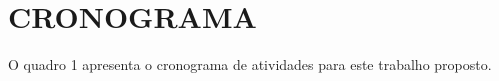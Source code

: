 
\chapter{CRONOGRAMA}
\label{sec:cronograma}

O quadro 1 apresenta o cronograma de atividades para este trabalho proposto.

